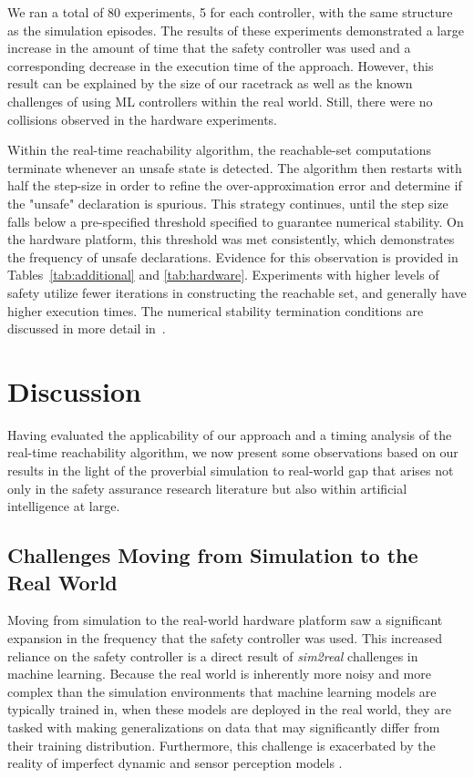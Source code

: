 \documentclass[manuscript,screen,review]{acmart}
\begin{document}
We ran a total of 80 experiments, 5 for each controller, with the same structure as the simulation episodes. The results of these experiments demonstrated a large increase in the amount of time that the safety controller was used and a corresponding decrease in the execution time of the approach. However, this result can be explained by the size of our racetrack as well as the known challenges of using ML controllers within the real world. Still, there were no collisions observed in the hardware experiments.

Within the real-time reachability algorithm, the reachable-set computations terminate whenever an unsafe state is detected. The algorithm then restarts with half the step-size in order to refine the over-approximation error and determine if the "unsafe" declaration is spurious. This strategy continues, until the step size falls below a pre-specified threshold specified to guarantee numerical stability. On the hardware platform, this threshold was met consistently, which demonstrates the frequency of unsafe declarations. Evidence for this observation is provided in Tables~\ref{tab:additional} and \ref{tab:hardware}. Experiments with higher levels of safety utilize fewer iterations in constructing the reachable set, and generally have higher execution times. 
The numerical stability termination conditions are discussed in more detail in~\cite{Johnson2016}.







\section{Discussion}

Having evaluated the applicability of our approach and a timing analysis of the real-time reachability algorithm, we now present some observations based on our results in the light of the proverbial simulation to real-world gap that arises not only in the safety assurance research literature but also within artificial intelligence at large.

\subsection{Challenges Moving from Simulation to the Real World}

Moving from simulation to the real-world hardware platform saw a significant expansion in the frequency that the safety controller was used. This increased reliance on the safety controller is a direct result of \emph{sim2real} challenges in machine learning. Because the real world is inherently more noisy and more complex than the simulation environments that machine learning models are typically trained in, when these models are deployed in the real world, they are tasked with making generalizations on data that may significantly differ from their training distribution. Furthermore, this challenge is exacerbated by the reality of imperfect dynamic and sensor perception models \cite{ivanov2020case}.
\end{document}
